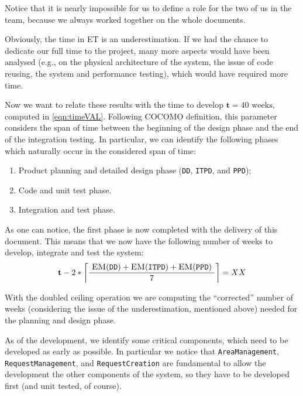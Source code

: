 Notice that it is nearly impossible for us to define a role for the two of us in the team, because we always worked together on the whole documents. 

Obviously, the time in \textsc{ET} is an underestimation. If we had the chance to dedicate our full time to the project, many more aspects would have been analysed (e.g., on the physical architecture of the system, the issue of code reusing, the system and performance testing), which would have required more time. 

Now we want to relate these results with the time to develop $ \mathbf{t} = 40 \text{ weeks} $, computed in \cref{eqn:timeVAL}. Following COCOMO definition, this parameter considers the span of time between the beginning of the design phase and the end of the integration testing. In particular, we can identify the following phases which naturally occur in the considered span of time: \begin{enumerate}
	
	\item Product planning and detailed design phase (\texttt{DD}, \texttt{ITPD}, and \texttt{PPD});
	
	\item Code and unit test phase. 
	
	\item Integration and test phase. 
	
\end{enumerate}

As one can notice, the first phase is now completed with the delivery of this document. This means that we now have the following number of weeks to develop, integrate and test the system:\begin{equation}
%
\mathbf{t} - 2 * \left\lceil \frac{ \text{ \textsc{EM}(\texttt{DD})} +  
									\text{\textsc{EM}(\texttt{ITPD})} +
									\text{\textsc{EM}(\texttt{PPD}) }
								   }{7} \right\rceil = XX
%	
\end{equation}

With the doubled ceiling operation we are computing the ``corrected'' number of weeks (considering the issue of the underestimation, mentioned above) needed for the planning and design phase.

As of the development, we identify some critical components, which need to be developed as early as possible. In particular we notice that \texttt{Area\-Man\-age\-ment}, \texttt{Re\-quest\-Man\-age\-ment}, and \texttt{Re\-quest\-Cre\-ation} are fundamental to allow the development the other components of the system, so they have to be developed first (and unit tested, of course). 

